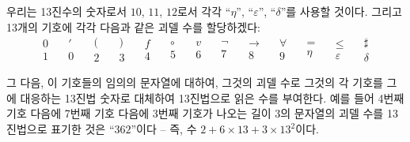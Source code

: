 \documentclass[12pt]{paper}
\begin{document}
  우리는 13진수의 숫자로서 $10$, $11$, $12$로서 각각 ``$\eta$'', ``$\varepsilon$'', ``$\delta$''를 사용할 것이다.
  그리고 13개의 기호에 각각 다음과 같은 괴델 수를 할당하겠다:
  $$ \begin{matrix}
    0 \\
    1
  \end{matrix} \quad
  \begin{matrix}
    ' \\
    0
  \end{matrix} \quad
  \begin{matrix}
    ( \\
    2
  \end{matrix} \quad
  \begin{matrix}
    ) \\
    3
  \end{matrix} \quad
  \begin{matrix}
    f \\
    4
  \end{matrix} \quad
  \begin{matrix}
    \circ \\
    5
  \end{matrix} \quad
  \begin{matrix}
    v \\
    6  
  \end{matrix} \quad
  \begin{matrix}
    \lnot \\
    7
  \end{matrix} \quad
  \begin{matrix}
    \rightarrow \\
    8
  \end{matrix} \quad
  \begin{matrix}
    \forall \\
    9
  \end{matrix} \quad
  \begin{matrix}
    = \\
    \eta
  \end{matrix} \quad
  \begin{matrix}
    \leq \\
    \varepsilon
  \end{matrix} \quad
  \begin{matrix}
    \sharp \\
    \delta
  \end{matrix} $$

  그 다음, 이 기호들의 임의의 문자열에 대하여,
  그것의 괴델 수로 그것의 각 기호를 그에 대응하는 13진법 숫자로 대체하여 13진법으로 읽은 수를 부여한다.
  예를 들어 4번째 기호 다음에 7번째 기호 다음에 3번째 기호가 나오는 길이 3의 문자열의 괴델 수를 13진법으로 표기한 것은 ``$362$''이다 --
  즉, 수 $2 + 6 \times 13 + 3 \times 13^{2}$이다.
\end{document}
